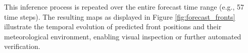 This inference process is repeated over the entire forecast time range (e.g., 57 time steps). The resulting maps as displayed in Figure \ref{fig:forecast_fronts} illustrate the temporal evolution of predicted front positions and their meteorological environment, enabling visual inspection or further automated verification.




